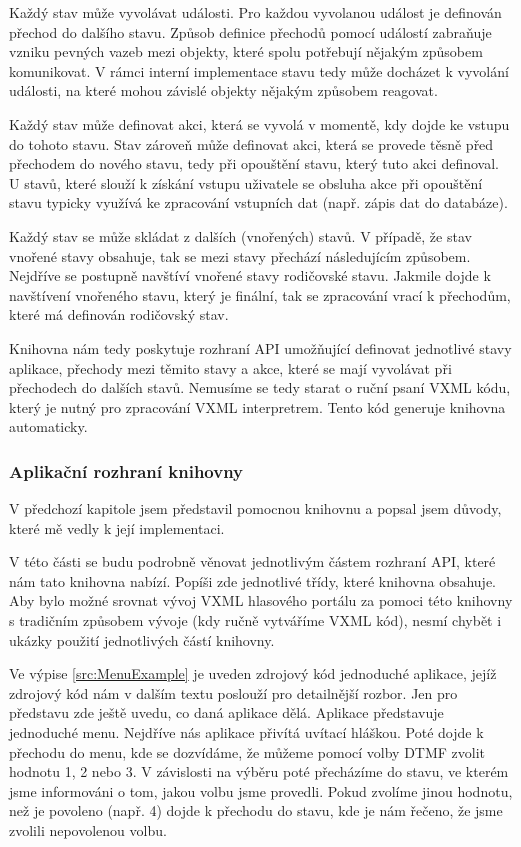 \documentclass[ing,male,java,dept460]{diploma}						%
\begin{document}
Každý stav může vyvolávat události. Pro každou vyvolanou událost je definován přechod do dalšího stavu. Způsob definice přechodů pomocí událostí zabraňuje vzniku pevných vazeb mezi objekty, které spolu potřebují nějakým způsobem komunikovat. V rámci interní implementace stavu tedy může docházet k vyvolání události, na které mohou závislé objekty nějakým způsobem reagovat.

Každý stav může definovat akci, která se vyvolá v momentě, kdy dojde ke vstupu do tohoto stavu. Stav zároveň může definovat akci, která se provede těsně před přechodem do nového stavu, tedy při opouštění stavu, který tuto akci definoval. U stavů, které slouží k získání vstupu uživatele se obsluha akce při opouštění stavu typicky využívá ke zpracování vstupních dat (např. zápis dat do databáze).

Každý stav se může skládat z dalších (vnořených) stavů. V případě, že stav vnořené stavy obsahuje, tak se mezi stavy přechází následujícím způsobem. Nejdříve se postupně navštíví vnořené stavy rodičovské stavu. Jakmile dojde k navštívení vnořeného stavu, který je finální, tak se zpracování vrací k přechodům, které má definován rodičovský stav.

Knihovna nám tedy poskytuje rozhraní API umožňující definovat jednotlivé stavy aplikace, přechody mezi těmito stavy a akce, které se mají vyvolávat při přechodech do dalších stavů. Nemusíme se tedy starat o ruční psaní VXML kódu, který je nutný pro zpracování VXML interpretrem. Tento kód generuje knihovna automaticky.

\subsubsection{Aplikační rozhraní knihovny}
V předchozí kapitole jsem představil pomocnou knihovnu a popsal jsem důvody, které mě vedly k její implementaci.

V této části se budu podrobně věnovat jednotlivým částem rozhraní API, které nám tato knihovna nabízí. Popíši zde jednotlivé třídy, které knihovna obsahuje. Aby bylo možné srovnat vývoj VXML hlasového portálu za pomoci této knihovny s tradičním způsobem vývoje (kdy ručně vytváříme VXML kód), nesmí chybět i ukázky použití jednotlivých částí knihovny.

Ve výpise \ref{src:MenuExample} je uveden zdrojový kód jednoduché aplikace, jejíž zdrojový kód nám v dalším textu poslouží pro detailnější rozbor. Jen pro představu zde ještě uvedu, co daná aplikace dělá. Aplikace představuje jednoduché menu. Nejdříve nás aplikace přivítá uvítací hláškou. Poté dojde k přechodu do menu, kde se dozvídáme, že můžeme pomocí volby DTMF zvolit hodnotu 1, 2 nebo 3. V závislosti na výběru poté přecházíme do stavu, ve kterém jsme informováni o tom, jakou volbu jsme provedli. Pokud zvolíme jinou hodnotu, než je povoleno (např. 4) dojde k přechodu do stavu, kde je nám řečeno, že jsme zvolili nepovolenou volbu.
\end{document}
